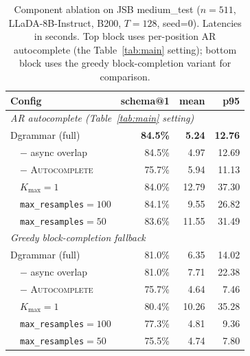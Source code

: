 \documentclass[11pt]{article}
\begin{document}
\begin{table}[!ht]
\small
\centering
\begin{tabular}{lrrr}
\toprule
\textbf{Config} & \textbf{schema@1} & \textbf{mean} & \textbf{p95} \\
\midrule
\multicolumn{4}{l}{\textit{AR autocomplete (Table~\ref{tab:main} setting)}} \\
Dgrammar (full)        & \textbf{84.5\%} & \textbf{5.24} & \textbf{12.76} \\
~~$-$ async overlap             & 84.5\%          & 4.97          & 12.69 \\
~~$-$ \textsc{Autocomplete}     & 75.7\%          & 5.94          & 11.13 \\
~~$K_{\max}{=}1$                & 84.0\%          & 12.79         & 37.30 \\
~~\texttt{max\_resamples}${=}100$ & 84.1\%        & 9.55          & 26.82 \\
~~\texttt{max\_resamples}${=}50$  & 83.6\%        & 11.55         & 31.49 \\
\midrule
\multicolumn{4}{l}{\textit{Greedy block-completion fallback}} \\
Dgrammar (full)        & 81.0\%          & 6.35          & 14.02 \\
~~$-$ async overlap             & 81.0\%          & 7.71          & 22.38 \\
~~$-$ \textsc{Autocomplete}     & 75.7\%          & 4.64          &  7.46 \\
~~$K_{\max}{=}1$                & 80.4\%          & 10.26         & 35.28 \\
~~\texttt{max\_resamples}${=}100$ & 77.3\%        & 4.81          &  9.36 \\
~~\texttt{max\_resamples}${=}50$  & 75.5\%        & 4.74          &  7.80 \\
\bottomrule
\end{tabular}
\caption{Component ablation on JSB medium\_test ($n{=}511$, LLaDA-8B-Instruct, B200, $T{=}128$, seed=0). Latencies in seconds. Top block uses per-position AR autocomplete (the Table~\ref{tab:main} setting); bottom block uses the greedy block-completion variant for comparison.}
\label{tab:ablation}
\end{table}
\end{document}
